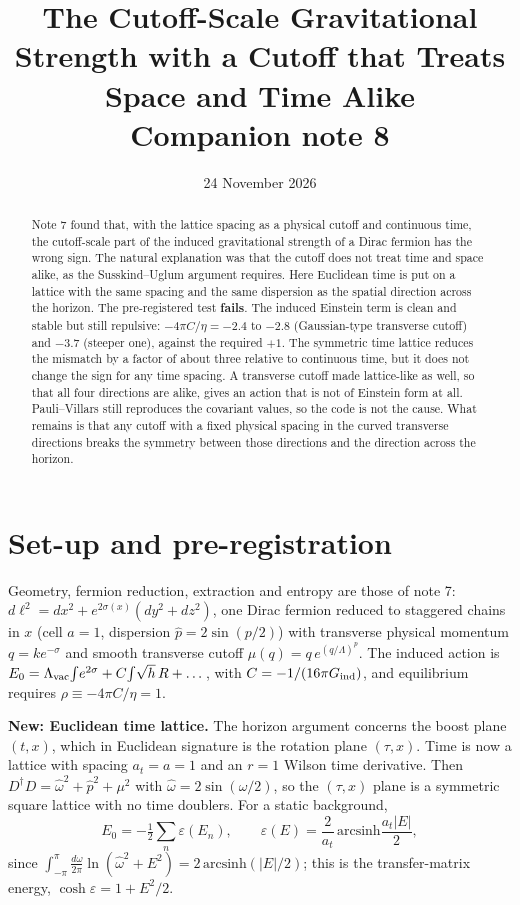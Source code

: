 \documentclass[11pt]{article}
\title{The Cutoff-Scale Gravitational Strength with a Cutoff that Treats Space and Time Alike\\[4pt]\large Companion note 8}
\author{}\date{24 November 2026}
\begin{document}
\maketitle
\begin{abstract}
Note 7 found that, with the lattice spacing as a physical cutoff and continuous time, the cutoff-scale part of the induced gravitational strength of a Dirac fermion has the wrong sign. The natural explanation was that the cutoff does not treat time and space alike, as the Susskind--Uglum argument requires. Here Euclidean time is put on a lattice with the same spacing and the same dispersion as the spatial direction across the horizon. The pre-registered test \textbf{fails}. The induced Einstein term is clean and stable but still repulsive: $-4\pi C/\eta=-2.4$ to $-2.8$ (Gaussian-type transverse cutoff) and $-3.7$ (steeper one), against the required $+1$. The symmetric time lattice reduces the mismatch by a factor of about three relative to continuous time, but it does not change the sign for any time spacing. A transverse cutoff made lattice-like as well, so that all four directions are alike, gives an action that is not of Einstein form at all. Pauli--Villars still reproduces the covariant values, so the code is not the cause. What remains is that any cutoff with a fixed physical spacing in the curved transverse directions breaks the symmetry between those directions and the direction across the horizon.
\end{abstract}

\section{Set-up and pre-registration}
Geometry, fermion reduction, extraction and entropy are those of note 7: $d\ell^2=dx^2+e^{2\sigma(x)}(dy^2+dz^2)$, one Dirac fermion reduced to staggered chains in $x$ (cell $a=1$, dispersion $\hat p=2\sin(p/2)$) with transverse physical momentum $q=ke^{-\sigma}$ and smooth transverse cutoff $\mu(q)=q\,e^{(q/\Lambda)^p}$. The induced action is $E_0=\Lambda_{\rm vac}\!\int\!e^{2\sigma}+C\!\int\!\sqrt h\,R+\dots$, with $C=-1/(16\pi G_{\rm ind})$, and equilibrium requires $\rho\equiv-4\pi C/\eta=1$.

\textbf{New: Euclidean time lattice.} The horizon argument concerns the boost plane $(t,x)$, which in Euclidean signature is the rotation plane $(\tau,x)$. Time is now a lattice with spacing $a_t=a=1$ and an $r=1$ Wilson time derivative. Then $D^\dagger D=\hat\omega^2+\hat p^2+\mu^2$ with $\hat\omega=2\sin(\omega/2)$, so the $(\tau,x)$ plane is a symmetric square lattice with no time doublers. For a static background,
\[
E_0=-\tfrac12\sum_n\varepsilon(E_n),\qquad \varepsilon(E)=\frac{2}{a_t}\,\mathrm{arcsinh}\frac{a_t|E|}{2},
\]
since $\int_{-\pi}^{\pi}\frac{d\omega}{2\pi}\ln(\hat\omega^2+E^2)=2\,\mathrm{arcsinh}(|E|/2)$; this is the transfer-matrix energy, $\cosh\varepsilon=1+E^2/2$.
\end{document}
